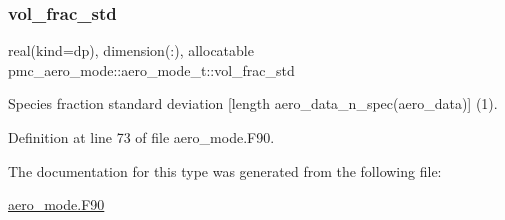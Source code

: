 \subsubsection{\texorpdfstring{vol\+\_\+frac\+\_\+std}{vol\_frac\_std}}
{\footnotesize\ttfamily real(kind=dp), dimension(\+:), allocatable pmc\+\_\+aero\+\_\+mode\+::aero\+\_\+mode\+\_\+t\+::vol\+\_\+frac\+\_\+std}



Species fraction standard deviation \mbox{[}length {\ttfamily aero\+\_\+data\+\_\+n\+\_\+spec(aero\+\_\+data)}\mbox{]} (1). 



Definition at line 73 of file aero\+\_\+mode.\+F90.



The documentation for this type was generated from the following file\+:\begin{DoxyCompactItemize}
\item 
\mbox{\hyperlink{aero__mode_8_f90}{aero\+\_\+mode.\+F90}}\end{DoxyCompactItemize}
